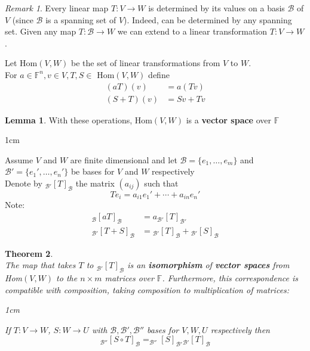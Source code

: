 \documentclass[11pt, a4paper]{report}
\makeatletter
\numberwithin{equation}{section}
\newcommand{\F}{\mathbb{F}}
\numberwithin{equation}{subsection}
\theoremstyle{plain}
\newtheorem{thm}{Theorem}[chapter] %
\theoremstyle{definition}
\newtheorem{lem}[thm]{Lemma}
\theoremstyle{remark}
\newtheorem*{rem}{Remark}
\newtheorem*{prf}{Proof}
\renewenvironment{prf}[1][\proofname]{\par
  \vspace{-\topsep}%
  \normalfont
  \topsep0pt \partopsep0pt %
  \trivlist
  \item[\hskip\labelsep
        \itshape
    #1\@addpunct{.}]\ignorespaces
}{%
  \popQED\endtrivlist\@endpefalse
  \addvspace{6pt plus 6pt} %
}
\newcommand{\pr}[1]{\begin{adjustwidth}{1cm}{} \begin{prf} #1 \end{prf} \end{adjustwidth}}
\makeatother
\begin{document}
\begin{rem} 
Every linear map $T: V \to W$ is determined by its values on a basis $\mathcal{B}$ of $V$ (since $\mathcal{B}$ is a spanning set of $V$). Indeed, can be determined by any spanning set. Given any map $T: \mathcal{B} \to W$ we can extend to a linear transformation $T: V \to W$.
\end{rem}
\newpage

Let Hom$(V,W)$ be the set of linear transformations from $V$ to $W$.\\ For $a \in \F^n, v \in V, T, S \in$ Hom$(V,W)$ define
\begin{align*}
(aT)(v) &= a(Tv)\\
(S+T)(v) &= Sv + Tv
\end{align*}

\begin{lem} With these operations, Hom$(V,W)$ is a \textbf{vector space} over $\F$
\pr{
Assume $V$ and $W$ are finite dimensional and let $\mathcal{B} = \{e_1, \ldots, e_m\}$ and $\mathcal{B}' = \{e_1', \ldots, e_n'\}$ be bases for $V$ and $W$ respectively\\
Denote by $_\mathcal{B'}[T]_\mathcal{B}$ the matrix $(a_{ij})$ such that $$Te_i = a_{i1} e_1' + \cdots + a_{in}e_n'$$
Note: 	\begin{align*}
			_\mathcal{B}[aT]_\mathcal{B} &= a _\mathcal{B'}[T]_\mathcal{B'}\\
			_\mathcal{B'}[T+S]_\mathcal{B} &=  {_\mathcal{B'}}[T]_\mathcal{B} + {_\mathcal{B'}}[S]_\mathcal{B}
		\end{align*}
}
\end{lem}

\begin{thm}${}$\\
The map that takes $T$ to $_\mathcal{B'}[T]_\mathcal{B}$ is an \textbf{isomorphism} of \textbf{vector spaces} from Hom$(V,W)$ to the $n \times m$ matrices over $\F$. Furthermore, this correspondence is compatible with composition, taking composition to multiplication of matrices:
\pr{
If $T: V \to W$, $S: W \to U$ with $\mathcal{B, B', B''}$ bases for $V, W, U$ respectively then
$$_\mathcal{B''}[S \circ T]_\mathcal{B} = _\mathcal{B''}[S]_\mathcal{B'} {_\mathcal{B'}}[T]_\mathcal{B}$$
}
\end{thm}
\end{document}
